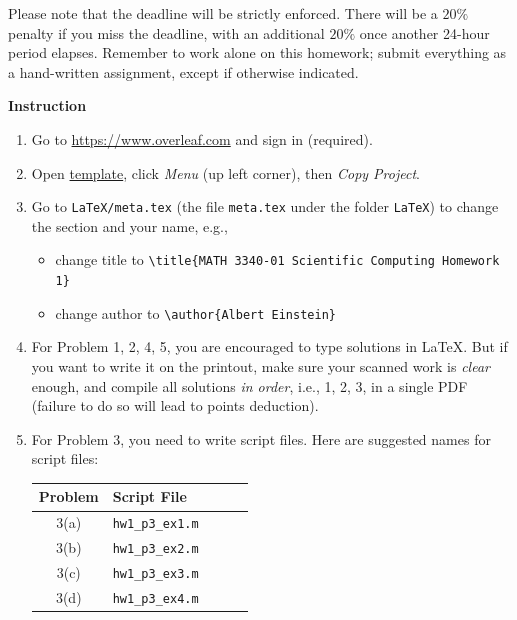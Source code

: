Please note that the deadline will be strictly enforced. There will be a $20\%$ penalty if you miss the deadline, with an additional $20\%$ once another 24-hour period elapses. Remember to work alone on this homework; submit everything as a hand-written assignment, except if otherwise indicated.

\vspace{15pt}

\textbf{Instruction}

\begin{enumerate}[label={\arabic*.}]
  \item Go to \url{https://www.overleaf.com} and sign in (required).
  \item Open \href{https://www.overleaf.com/read/qhfsxjjmrpcs}{template}, click \emph{Menu} (up left corner), then \emph{Copy Project}.
  \item Go to \verb|LaTeX/meta.tex| (the file \verb|meta.tex| under the folder \verb|LaTeX|) to change the section and your name, e.g.,
    \begin{itemize}
      \item change title to \verb|\title{MATH 3340-01 Scientific Computing Homework 1}|
      \item change author to \verb|\author{Albert Einstein}|
    \end{itemize}
  \item For Problem 1, 2, 4, 5, you are encouraged to type solutions in \LaTeX{}. But if you want to write it on the printout, make sure your scanned work is \emph{clear} enough, and compile all solutions \emph{in order}, i.e., 1, 2, 3, in a single PDF (failure to do so will lead to points deduction).
  \item For Problem 3, you need to write script files. Here are suggested names for script files:
    \begin{table}[!hbtp]
      \centering
      \begin{tabular}{cllll}
        \toprule
        Problem & Script File         \\
        \midrule
        3(a)    & \verb|hw1_p3_ex1.m| \\
        3(b)    & \verb|hw1_p3_ex2.m| \\
        3(c)    & \verb|hw1_p3_ex3.m| \\
        3(d)    & \verb|hw1_p3_ex4.m| \\
        \bottomrule
      \end{tabular}
    \end{table}


\end{enumerate}
